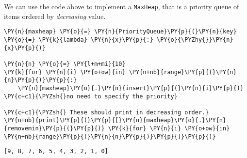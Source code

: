 We can use the code above to implement a \texttt{MaxHeap}, that is a priority queue of items ordered by \emph{decreasing} value.


\begin{Verbatim}[commandchars=\\\{\}]
\PY{n}{maxheap} \PY{o}{=} \PY{n}{PriorityQueue}\PY{p}{(}\PY{n}{key} \PY{o}{=} \PY{k}{lambda} \PY{n}{x}\PY{p}{:} \PY{o}{\PYZhy{}}\PY{n}{x}\PY{p}{)}

\PY{n}{n} \PY{o}{=} \PY{l+m+mi}{10}
\PY{k}{for} \PY{n}{i} \PY{o+ow}{in} \PY{n+nb}{range}\PY{p}{(}\PY{n}{n}\PY{p}{)}\PY{p}{:}
    \PY{n}{maxheap}\PY{o}{.}\PY{n}{insert}\PY{p}{(}\PY{n}{i}\PY{p}{)} \PY{c+c1}{\PYZsh{}no need to specify the priority}

\PY{c+c1}{\PYZsh{} These should print in decreasing order.}
\PY{n+nb}{print}\PY{p}{(}\PY{p}{[}\PY{n}{maxheap}\PY{o}{.}\PY{n}{removemin}\PY{p}{(}\PY{p}{)} \PY{k}{for} \PY{n}{i} \PY{o+ow}{in} \PY{n+nb}{range}\PY{p}{(}\PY{n}{n}\PY{p}{)}\PY{p}{]}\PY{p}{)}
\end{Verbatim}

\begin{Verbatim}
[9, 8, 7, 6, 5, 4, 3, 2, 1, 0]

\end{Verbatim}
